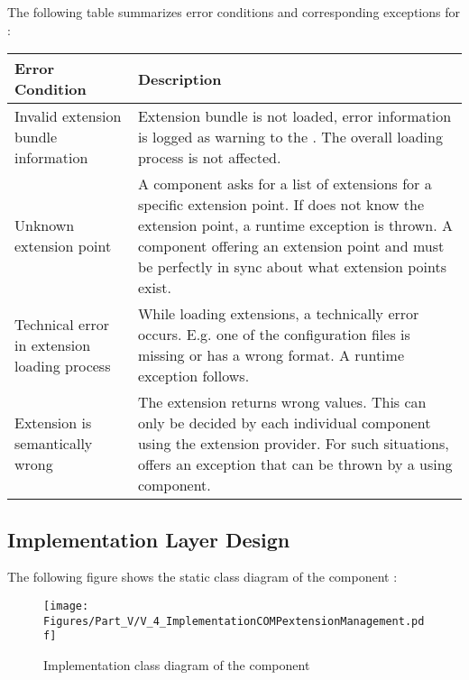 The following table summarizes error conditions and corresponding exceptions for \COMPextensionManagement{}:

\begin{longtable}{|p{}|p{}|}
	\hline
	Error Condition & Description \\
	\endhead
	\hline
	Invalid extension bundle information & Extension bundle is not loaded, error information is logged as warning to the \ACTORuser{}. The overall loading process is not affected.\\
	\hline
	Unknown extension point & A component asks \COMPextensionManagement{} for a list of extensions for a specific extension point. If \COMPextensionManagement{} does not know the extension point, a runtime exception is thrown. A component offering an extension point and \COMPextensionManagement{} must be perfectly in sync about what extension points exist.\\
	\hline
	Technical error in extension loading process & While loading extensions, a technically error occurs. E.g. one of the configuration files is missing or has a wrong format. A runtime exception follows.\\
	\hline
	Extension is semantically wrong & The extension returns wrong values. This can only be decided by each individual component using the extension provider. For such situations, \COMPextensionManagement{} offers an exception that can be thrown by a using component.\\
	\hline
\end{longtable}


\subsection{Implementation Layer Design}
\label{sec:ImplementationDesignCOMPextensionManagement}

The following figure shows the static class diagram of the component \COMPextensionManagement{}:

\begin{figure}[H]
	\centering
	\texttt{[image: Figures/Part\_V/V\_4\_ImplementationCOMPextensionManagement.pdf]}
	\caption{Implementation class diagram of the component \COMPextensionManagement{}}
	\label{fig:V_4_ImplementationCOMPextensionManagement}
\end{figure}

